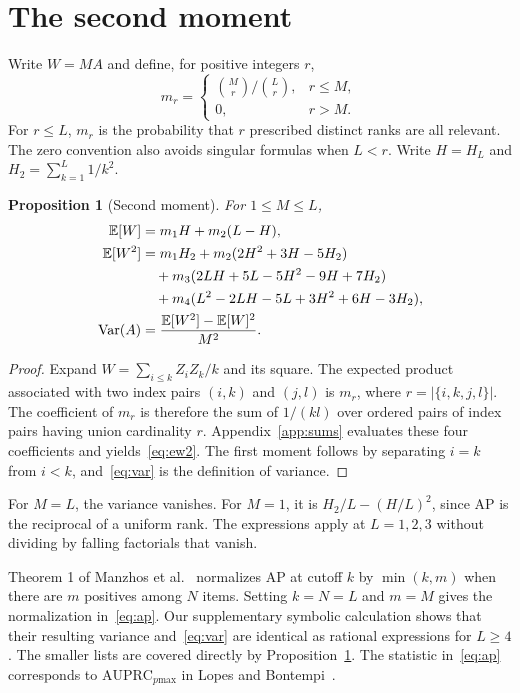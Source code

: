 \documentclass[10pt]{article}
\newtheorem{proposition}{Proposition}
\newcommand{\E}{\mathbb{E}}
\newcommand{\Var}{\operatorname{Var}}
\begin{document}
\section{The second moment}
Write $W=MA$ and define, for positive integers $r$,
\[
 m_r=\begin{cases}\binom Mr/\binom Lr,&r\le M,\\0,&r>M.\end{cases}
\]
For $r\le L$, $m_r$ is the probability that $r$ prescribed distinct ranks are all relevant.
The zero convention also avoids singular formulas when $L<r$.
Write $H=H_L$ and $H_2=\sum_{k=1}^L1/k^2$.
\begin{proposition}[Second moment]\label{prop:second}
For $1\le M\le L$,
\begin{align}
 \E[W]&=m_1H+m_2(L-H),\label{eq:ew}\\
 \E[W^2]&=m_1H_2+m_2(2H^2+3H-5H_2)\notag\\
 &\quad+m_3(2LH+5L-5H^2-9H+7H_2)\notag\\
 &\quad+m_4(L^2-2LH-5L+3H^2+6H-3H_2),\label{eq:ew2}\\
 \Var(A)&=\frac{\E[W^2]-\E[W]^2}{M^2}.\label{eq:var}
\end{align}
\end{proposition}
\begin{proof}
Expand $W=\sum_{i\le k}Z_iZ_k/k$ and its square.
The expected product associated with two index pairs $(i,k)$ and $(j,l)$ is $m_r$, where $r=|\{i,k,j,l\}|$.
The coefficient of $m_r$ is therefore the sum of $1/(kl)$ over ordered pairs of index pairs having union cardinality $r$.
Appendix~\ref{app:sums} evaluates these four coefficients and yields~\eqref{eq:ew2}.
The first moment follows by separating $i=k$ from $i<k$, and~\eqref{eq:var} is the definition of variance.
\end{proof}
For $M=L$, the variance vanishes.
For $M=1$, it is $H_2/L-(H/L)^2$, since AP is the reciprocal of a uniform rank.
The expressions apply at $L=1,2,3$ without dividing by falling factorials that vanish.

Theorem 1 of Manzhos et al.~\cite{manzhos} normalizes AP at cutoff $k$ by $\min(k,m)$ when there are $m$ positives among $N$ items.
Setting $k=N=L$ and $m=M$ gives the normalization in~\eqref{eq:ap}.
Our supplementary symbolic calculation shows that their resulting variance and~\eqref{eq:var} are identical as rational expressions for $L\ge4$.
The smaller lists are covered directly by Proposition~\ref{prop:second}.
The statistic in~\eqref{eq:ap} corresponds to $\mathrm{AUPRC}_{p\mathrm{max}}$ in Lopes and Bontempi~\cite{lopes}.
\end{document}
